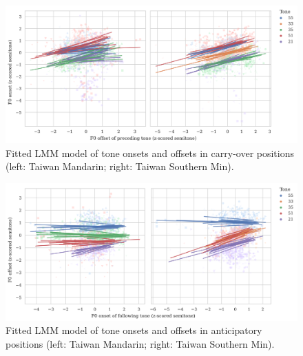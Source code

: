 \documentclass[12pt]{report}
\begin{document}
\begin{CJK}{UTF8}{bsmi}
\begin{figure}[hbt!]
\centering
\includegraphics[width=\textwidth, trim={0 .5cm 0 0}]{Figures/E1/Carryover_lang_seperated.png}
\caption{Fitted LMM model of tone onsets and offsets in carry-over positions (left: Taiwan Mandarin; right: Taiwan Southern Min).}
\label{Figure:LMMCarryover}
\end{figure}

\begin{figure}[hbt!]
\centering
\includegraphics[width=\textwidth, trim={0 .5cm 0 0}]{Figures/E1/Anticipatory_lang_seperated.png}
\caption{Fitted LMM model of tone onsets and offsets in anticipatory positions (left: Taiwan Mandarin; right: Taiwan Southern Min).}
\label{Figure:LMMAnticipatory}
\end{figure}

%


\end{CJK}
\end{document}
